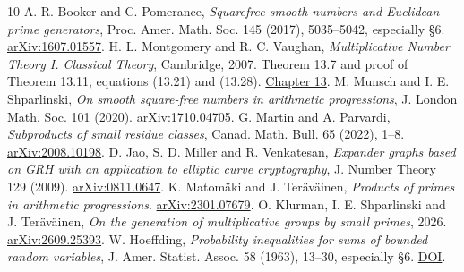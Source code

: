 \documentclass[11pt]{article}
\begin{document}
\begin{thebibliography}{10}
 A. R. Booker and C. Pomerance, \emph{Squarefree smooth numbers
and Euclidean prime generators}, Proc. Amer. Math. Soc. 145 (2017),
5035--5042, especially \S6. \href{https://arxiv.org/abs/1607.01557}{arXiv:1607.01557}.
 H. L. Montgomery and R. C. Vaughan, \emph{Multiplicative Number
Theory I. Classical Theory}, Cambridge, 2007. Theorem 13.7 and proof of
Theorem 13.11, equations (13.21) and (13.28).
\href{https://doi.org/10.1017/CBO9780511618314.015}{Chapter 13}.
 M. Munsch and I. E. Shparlinski, \emph{On smooth square-free
numbers in arithmetic progressions}, J. London Math. Soc. 101 (2020).
\href{https://arxiv.org/abs/1710.04705}{arXiv:1710.04705}.
 G. Martin and A. Parvardi, \emph{Subproducts of small residue
classes}, Canad. Math. Bull. 65 (2022), 1--8.
\href{https://arxiv.org/abs/2008.10198}{arXiv:2008.10198}.
 D. Jao, S. D. Miller and R. Venkatesan,
\emph{Expander graphs based on GRH with an application to elliptic curve
cryptography}, J. Number Theory 129 (2009).
\href{https://arxiv.org/abs/0811.0647}{arXiv:0811.0647}.
 K. Matom\"aki and J. Ter\"av\"ainen, \emph{Products of primes in
arithmetic progressions}. \href{https://arxiv.org/abs/2301.07679}{arXiv:2301.07679}.
 O. Klurman, I. E. Shparlinski and J. Ter\"av\"ainen,
\emph{On the generation of multiplicative groups by small primes}, 2026.
\href{https://arxiv.org/abs/2609.25393}{arXiv:2609.25393}.
 W. Hoeffding, \emph{Probability inequalities for sums
of bounded random variables}, J. Amer. Statist. Assoc. 58 (1963), 13--30,
especially \S6. \href{https://doi.org/10.1080/01621459.1963.10500830}{DOI}.
\end{thebibliography}
\end{document}
